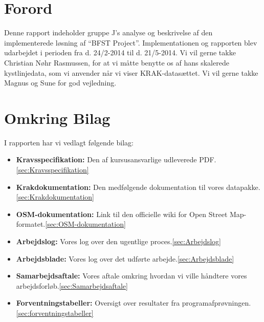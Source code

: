 \section{Forord}
Denne rapport indeholder gruppe J's analyse og beskrivelse af den implementerede løsning af ``BFST Project''. Implementationen og rapporten blev udarbejdet i perioden fra d. 24/2-2014 til d. 21/5-2014.
Vi vil gerne takke Christian Nøhr Rasmussen, for at vi måtte benytte os af hans skalerede kystlinjedata, som vi anvender når vi viser KRAK-datasættet. Vi vil gerne takke Magnus og Sune for god vejledning.

\section{Omkring Bilag}
I rapporten har vi vedlagt følgende bilag:
\begin{itemize}
	\item \textbf{Kravsspecifikation:} Den af kursusansvarlige udleverede PDF.\ref{sec:Kravsspecifikation}
	\item \textbf{Krakdokumentation:} Den medfølgende dokumentation til vores datapakke.\ref{sec:Krakdokumentation}
	\item \textbf{OSM-dokumentation:} Link til den officielle wiki for Open Street Map-formatet.\ref{sec:OSM-dokumentation}
	\item \textbf{Arbejdslog:} Vores log over den ugentlige proces.\ref{sec:Arbejdslog}
	\item \textbf{Arbejdsblade:} Vores log over det udførte arbejde.\ref{sec:Arbejdsblade}
	\item \textbf{Samarbejdsaftale:} Vores aftale omkring hvordan vi ville håndtere vores arbejdsforløb.\ref{sec:Samarbejdsaftale}
	\item \textbf{Forventningstabeller:} Oversigt over resultater fra programafprøvningen.\ref{sec:forventningstabeller}
\end{itemize}

